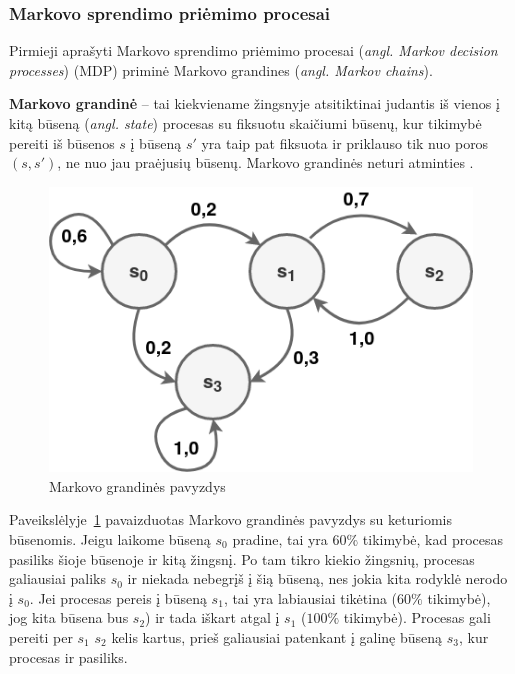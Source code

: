 \documentclass{VUMIFPSbakalaurinis}
\begin{document}
\subsubsection{Markovo sprendimo priėmimo procesai}\label{subsubsec:MDP}
{ 
	Pirmieji aprašyti Markovo sprendimo priėmimo procesai (\textit{angl. Markov decision processes}) (MDP) \cite{mdp} priminė Markovo grandines (\textit{angl. Markov chains}).\par
	
	\textbf{Markovo grandinė} -- tai kiekviename žingsnyje atsitiktinai judantis iš vienos į kitą būseną (\textit{angl. state}) procesas su fiksuotu skaičiumi būsenų, kur tikimybė pereiti iš būsenos \(s\) į būseną \(s'\) yra taip pat fiksuota ir priklauso tik nuo poros \((s, s')\), ne nuo jau praėjusių būsenų. Markovo grandinės neturi atminties \cite{handson}. 
	
	\begin{figure}[H]
		\centering
		\includegraphics[scale=0.5]{img/markov_chain}
		\caption{Markovo grandinės pavyzdys}
		\label{img:markovChain}
	\end{figure} 
	
	Paveikslėlyje~\ref{img:markovChain} pavaizduotas Markovo grandinės pavyzdys su keturiomis būsenomis. Jeigu laikome būseną \(s_0\) pradine, tai yra \(60\%\) tikimybė, kad procesas pasiliks šioje būsenoje ir kitą žingsnį. Po tam tikro kiekio žingsnių, procesas galiausiai paliks \(s_0\) ir niekada nebegrįš į šią būseną, nes jokia kita rodyklė nerodo į \(s_0\). Jei procesas pereis į būseną \(s_1\), tai yra labiausiai tikėtina (\(60\%\) tikimybė), jog kita būsena bus \(s_2\)) ir tada iškart atgal į \(s_1\) (\(100\%\) tikimybė). Procesas gali pereiti per \(s_1\) \(s_2\) kelis kartus, prieš galiausiai patenkant į galinę būseną \(s_3\), kur procesas ir pasiliks.\par
	
}
\end{document}
